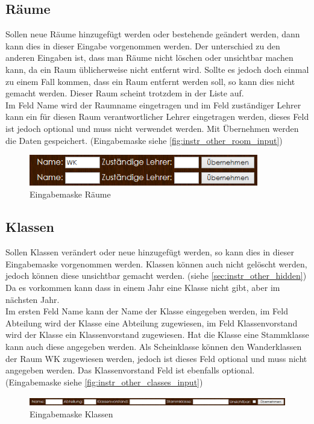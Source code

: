 \subsection{Räume}
Sollen neue Räume hinzugefügt werden oder bestehende geändert werden, dann kann dies in dieser Eingabe vorgenommen werden. Der unterschied zu den anderen Eingaben ist, dass man Räume nicht löschen oder unsichtbar machen kann, da ein Raum üblicherweise nicht entfernt wird. Sollte es jedoch doch einmal zu einem Fall kommen, dass ein Raum entfernt werden soll, so kann dies nicht gemacht werden. Dieser Raum scheint trotzdem in der Liste auf.\\
Im Feld Name wird der Raumname eingetragen und im Feld zuständiger Lehrer kann ein für diesen Raum verantwortlicher Lehrer eingetragen werden, dieses Feld ist jedoch optional und muss nicht verwendet werden. Mit Übernehmen werden die Daten gespeichert. (Eingabemaske siehe \autoref{fig:instr_other_room_input})
\begin{figure}[H]
\centering
\includegraphics[keepaspectratio=true, width=10cm]{images/screenshots/rooms_input.png}
\caption{Eingabemaske Räume}
\label{fig:instr_other_room_input}
\end{figure}
\subsection{Klassen}
Sollen Klassen verändert oder neue hinzugefügt werden, so kann dies in dieser Eingabemaske vorgenommen werden. Klassen können auch nicht gelöscht werden, jedoch können diese unsichtbar gemacht werden. (siehe \autoref{sec:instr_other_hidden}) Da es vorkommen kann dass in einem Jahr eine Klasse nicht gibt, aber im nächsten Jahr.\\
Im ersten Feld Name kann der Name der Klasse eingegeben werden, im Feld Abteilung wird der Klasse eine Abteilung zugewiesen, im Feld Klassenvorstand wird der Klasse ein Klassenvorstand zugewiesen. Hat die Klasse eine Stammklasse kann auch diese angegeben werden. Als Scheinklasse können den Wanderklassen der Raum WK zugewiesen werden, jedoch ist dieses Feld optional und muss nicht angegeben werden. Das Klassenvorstand Feld ist ebenfalls optional. (Eingabemaske siehe \autoref{fig:instr_other_classes_input})
\begin{figure}[H]
\centering
\includegraphics[keepaspectratio=true, width=17cm]{images/screenshots/classes_input.png}
\caption{Eingabemaske Klassen}
\label{fig:instr_other_classes_input}
\end{figure}
